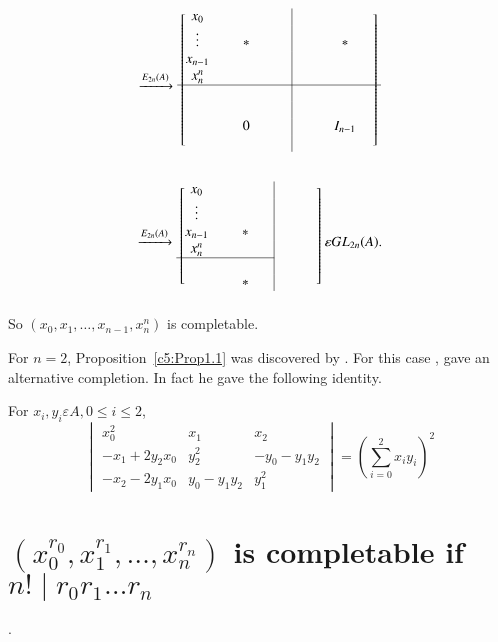 \begin{PRFF2}
\[
\xrightarrow{E_{2n}(A)}
  \begin{blockarray}{ccccc|cccc}
    \begin{block}{[ccccc|cccc]}
      x_0 & & && & & &  & \\
    \vdots && \ast & & & & & \ast  \\
    x_{n-1}& && & & &  & &\\
    x^{n}_n& & & && & & &\\
    \cline{1-9}%
    & & & & & & & &  \\
    & & & & & & & &  \\
    & & 0 & & & & & I_{n-1} \\
    & & & & & & & &  \\
      \end{block}
  \end{blockarray}
\]

\[
\xrightarrow{E_{2n}(A)}
  \begin{blockarray}{cccc|ccc}
    \begin{block}{[cccc|ccc]}
      x_0 & & && & & \\
    \vdots && & & & & \\
    x_{n-1}& & \ast & & &   \\
    x^{n}_n& & & & & &  \\
    \cline{1-4}%
    & & & & &&   \\
    & & \ast & & & &   \\
      \end{block}
  \end{blockarray}\varepsilon GL_{2n}(A).
\]
So $\left(x_0,x_1,\ldots,x_{n-1},x^{n}_n\right)$ is completable.
\enprf
\end{PRFF2}

\begin{rem}\label{c5:rem1.5}
For $n=2$, Proposition~\ref{c5:Prop1.1} was discovered by
\citet{Swan}. For this case  \citet{Krusemeyer}, gave an alternative
completion. In fact he gave the following identity.

For $x_i,y_i\varepsilon A, 0\leq i\leq 2$, 
$$
\begin{vmatrix}
x^{2}_0 & x_1 & x_2\\
-x_1+2y_2x_0 & y^{2}_2 & -y_0-y_1y_2\\
-x_2-2y_1x_0 & y_0-y_1y_2 & y^{2}_1
\end{vmatrix} = \left(\sum\limits_{i=0}^{2}x_iy_i\right)^{2}
$$
\end{rem}

\section{\texorpdfstring{$\left(x_0^{r_0},x_1^{r_1},\ldots,x^{r_n}_n\right)$}{ew} is
  completable if \texorpdfstring{$n!\mid r_0r_1\ldots r_n$}{ew}}.\label{c5:s2}

